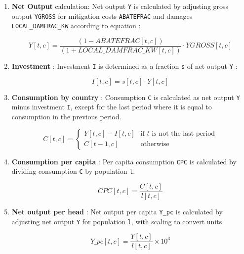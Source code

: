 \documentclass[
]{article}
\begin{document}
\begin{enumerate}
\def\labelenumi{\arabic{enumi}.}
\item
  \textbf{Net Output} calculation: Net output \texttt{Y} is calculated
  by adjusting gross output \texttt{YGROSS} for mitigation costs
  \texttt{ABATEFRAC} and damages \texttt{LOCAL\_DAMFRAC\_KW} according
  to equation :

  \begin{equation}
 Y[t,c] = \frac{(1 - ABATEFRAC[t,c])}{(1 + LOCAL\_DAMFRAC\_KW[t,c])} \cdot YGROSS[t,c] 
\end{equation}

\item
  \textbf{Investment} : Investment \texttt{I} is determined as a
  fraction \texttt{s} of net output \texttt{Y} :

  \begin{equation}
 I[t,c] = s[t,c] \cdot Y[t,c] 
\end{equation}

\item
  \textbf{Consumption by country} : Consumption \texttt{C} is calculated
  as net output \texttt{Y} minus investment \texttt{I}, except for the
  last period where it is equal to consumption in the previous period.

  \begin{equation}
 C[t,c] =
  \begin{cases}
  Y[t,c] - I[t,c] & \text{if } t \text{ is not the last period} \\
  C[t-1, c] & \text{otherwise}
  \end{cases}
  \end{equation}

\item
  \textbf{Consumption per capita} : Per capita consumption \texttt{CPC}
  is calculated by dividing consumption \texttt{C} by population
  \texttt{l}.

  \begin{equation}
 CPC[t,c] = \frac{C[t,c]}{l[t,c]}
\end{equation}

\item
  \textbf{Net output per head} : Net output per capita \texttt{Y\_pc} is
  calculated by adjusting net output \texttt{Y} for population
  \texttt{l}, with scaling to convert units.

  \begin{equation}
 Y\_pc[t,c] = \frac{Y[t,c]}{l[t,c]} \times 10^3
\end{equation}

\end{enumerate}
\end{document}
